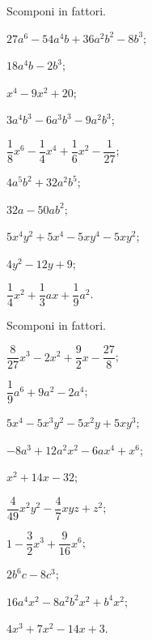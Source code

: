 \begin{esercizio}
 Scomponi in fattori.
 \begin{multicols}{2}
 \begin{enumeratea}
\item $27a^{6} - 54a^{4}b + 36a^{2}b^{2} - 8b^{3}$;
\item $18a^{4}b - 2b^{3}$;
\item $x^{4} - 9x^{2} + 20$;
\item $3a^{4}b^{3} - 6a^{3}b^{3} - 9a^{2}b^{3}$;
\item $\dfrac{1}{8}x^{6}-\dfrac{1}{4}x^{4}+\dfrac{1}{6}x^{2}-\dfrac{1}{27}$;
\item $4a^{5}b^{2} + 32a^{2}b^{5}$;
\item $32a - 50ab^{2}$;
\item $5x^{4} y^{2} + 5x^{4} - 5xy^{4} - 5xy^{2}$;
\item $4y^{2} - 12y + 9$;
\item $\dfrac{1}{4}x^{2}+\dfrac{1}{3}ax+\dfrac{1}{9}a^{2}$.
 \end{enumeratea}
 \end{multicols}
\end{esercizio}

\begin{esercizio}
 Scomponi in fattori.
 \begin{multicols}{2}
 \begin{enumeratea}
\item $\dfrac{8}{27}x^{3}-2x^{2}+\dfrac{9}{2}x-\dfrac{27}{8}$;
\item $\dfrac{1}{9}a^{6} + 9a^{2} - 2a^{4}$;
\item $5x^{4} - 5x^{3}y^{2} - 5x^{2}y + 5xy^{3}$;
\item $-8a^{3} + 12a^{2}x^{2} - 6ax^{4} + x^{6}$;
\item $x^{2}+14x-32$;
\item $\dfrac{4}{49}x^{2}y^{2}-\dfrac{4}{7}xyz+z^{2}$;
\item $1-\dfrac{3}{2}x^{3}+\dfrac{9}{16}x^{6}$;
\item $2b^{6}c - 8c^{3}$;
\item $16a^{4}x^{2} - 8a^{2}b^{2}x^{2} + b^{4}x^{2}$;
\item $4x^{3} + 7x^{2} - 14x + 3$.
 \end{enumeratea}
 \end{multicols}
\end{esercizio}

